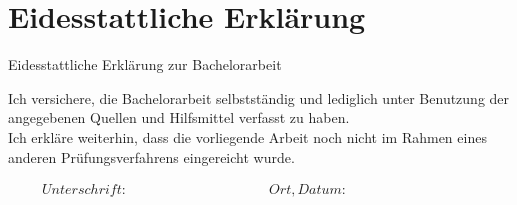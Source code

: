 \thispagestyle{empty}
\section*{Eidesstattliche Erklärung}

\vspace*{1cm}

\begin{LARGE}
    Eidesstattliche Erklärung zur Bachelorarbeit
\end{LARGE}

\vspace*{1cm}

\noindent
Ich versichere, die Bachelorarbeit selbstständig und lediglich unter Benutzung der angegebenen Quellen und Hilfsmittel verfasst zu haben. \\

\noindent
Ich erkläre weiterhin, dass die vorliegende Arbeit noch nicht im Rahmen eines anderen Prüfungsverfahrens eingereicht wurde.

\begin{displaymath}
\begin{array}{ll}
Unterschrift:~~~~~~~~~~~~~~~~~~~~~~~~~~~~~~~~~~~~~~~~~~
& Ort, Datum:~~~~~~~~~~~~~~~~~~~~~~~~~~~~~~~~~~~~~~~~~~
\end{array}
\end{displaymath}
